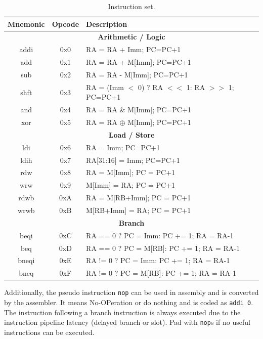 \begin{table}[!htbp]
  \centering
    \begin{tabular}{|c|c|p{8cm}|}
    \hline
    {\bf Mnemonic} & {\bf Opcode} & {\bf Description} \\
    \hline \hline
\multicolumn{3}{|c|}{{\bf Arithmetic / Logic}}\\
\hline \hline
    addi  & 0x0 & RA = RA + Imm; PC=PC+1\\
    \hline
    add   & 0x1 & RA = RA + M[Imm]; PC=PC+1\\
    \hline
    sub   & 0x2 & RA = RA - M[Imm]; PC=PC+1\\
    \hline
    shft  & 0x3 & RA = (Imm $<$ 0) ? RA $<<$ 1: RA $>>$ 1; PC=PC+1\\
    \hline
    and   & 0x4 & RA = RA \& M[Imm]; PC=PC+1\\
    \hline
    xor   & 0x5 & RA = RA $\oplus$ M[Imm]; PC=PC+1\\
    \hline
\multicolumn{3}{|c|}{{\bf Load / Store}}\\
\hline \hline
    ldi   & 0x6 & RA = Imm; PC=PC+1\\
    \hline
    ldih  & 0x7 & RA[31:16] = Imm; PC=PC+1\\
    \hline
    rdw   & 0x8 & RA = M[Imm]; PC = PC+1\\
    \hline
    wrw   & 0x9 & M[Imm] = RA; PC = PC+1\\
    \hline
    rdwb  & 0xA & RA = M[RB+Imm]; PC = PC+1\\
    \hline
    wrwb  & 0xB & M[RB+Imm] = RA; PC = PC+1\\
    \hline
\multicolumn{3}{|c|}{{\bf Branch}}\\
\hline \hline
    beqi  & 0xC & RA == 0 ? PC = Imm: PC += 1; RA = RA-1\\
    \hline
    beq   & 0xD & RA == 0 ? PC = M[RB]: PC += 1; RA = RA-1\\
    \hline
    bneqi & 0xE & RA != 0 ? PC = Imm: PC += 1; RA = RA-1\\
    \hline
    bneq  & 0xF & RA != 0 ? PC = M[RB]: PC += 1; RA = RA-1\\
    \hline

    \end{tabular}
  \caption{Instruction set.}
  \label{tab:isa}
\end{table}

Additionally, the pseudo instruction {\tt nop} can be used
in assembly and is converted by the assembler.
It means No-OPeration or do nothing and is coded as {\tt addi 0}.
The instruction following a branch instruction is always executed due
to the instruction pipeline latency (delayed branch or slot).  Pad with
{\tt nop}s if no useful instructions can be executed.

